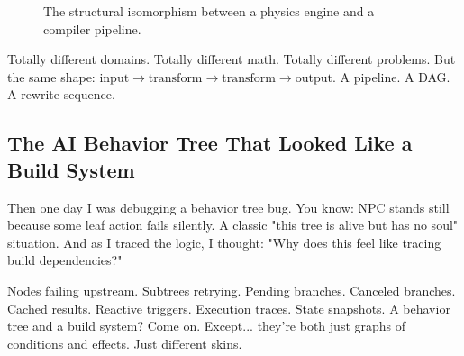 \begin{figure}[h]
    \centering
    \caption{The structural isomorphism between a physics engine and a compiler pipeline.}
    \label{fig:physics_vs_compiler}
\end{figure}

Totally different domains. Totally different math. Totally different problems. But the same shape: $\text{input} \rightarrow \text{transform} \rightarrow \text{transform} \rightarrow \text{output}$. A pipeline. A DAG. A rewrite sequence.

\subsection{The AI Behavior Tree That Looked Like a Build System}
Then one day I was debugging a behavior tree bug. You know: NPC stands still because some leaf action fails silently. A classic "this tree is alive but has no soul" situation. And as I traced the logic, I thought: "Why does this feel like tracing build dependencies?"

Nodes failing upstream. Subtrees retrying. Pending branches. Canceled branches. Cached results. Reactive triggers. Execution traces. State snapshots. A behavior tree and a build system? Come on. Except... they're both just graphs of conditions and effects. Just different skins.

